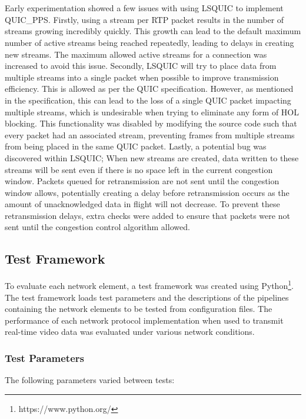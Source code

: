 \documentclass{mpaper}
\begin{document}
\\\\
Early experimentation showed a few issues with using \newline LSQUIC to implement QUIC\_PPS. Firstly, using a stream per RTP packet results in the number of streams growing incredibly quickly. This growth can lead to the default maximum number of active streams being reached repeatedly, leading to delays in creating new streams. The maximum allowed active streams for a connection was increased to avoid this issue. Secondly, LSQUIC will try to place data from multiple streams into a single packet when possible to improve transmission efficiency. This is allowed as per the QUIC specification\cite{rfc9000}. However, as mentioned in the specification, this can lead to the loss of a single QUIC packet impacting multiple streams, which is undesirable when trying to eliminate any form of HOL blocking. This functionality was disabled by modifying the source code such that every packet had an associated stream, preventing frames from multiple streams from being placed in the same QUIC packet. Lastly, a potential bug was discovered within LSQUIC; When new streams are created, data written to these streams will be sent even if there is no space left in the current congestion window. Packets queued for retransmission are not sent until the congestion window allows, potentially creating a delay before retransmission occurs as the amount of unacknowledged data in flight will not decrease. To prevent these retransmission delays, extra checks were added to ensure that packets were not sent until the congestion control algorithm allowed.


\subsection{Test Framework} \label{Test Framework}
\noindent To evaluate each network element, a test framework was created using Python\footnote{https://www.python.org/}. The test framework loads test parameters and the descriptions of the pipelines containing the network elements to be tested from configuration files. The performance of each network protocol implementation when used to transmit real-time video data was evaluated under various network conditions.

\subsubsection{Test Parameters} \label{Test Parameters}
\noindent The following parameters varied between tests:
\end{document}
